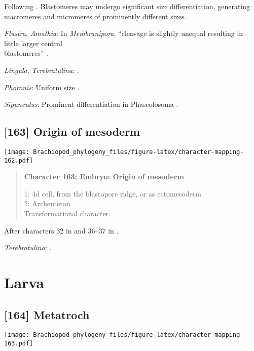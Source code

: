 \documentclass[openany]{book}
\theoremstyle{definition}
\theoremstyle{definition}
\theoremstyle{definition}
\theoremstyle{remark}
\begin{document}
Following \citet{Hejnol2010}. Blastomeres may undergo significant size
differentiation, generating macromeres and micromeres of prominently
different sizes.

\hypertarget{Amathia-coding-162}{}
\emph{Flustra}, \emph{Amathia}: In \emph{Membranipora}, ``cleavage is
slightly unequal resulting in little larger central\\
blastomeres'' \citep{Gruhl2010M}.

\hypertarget{Lingula-coding-162}{}
\emph{Lingula}, \emph{Terebratulina}: \citet{Williams1997Introduction}.

\hypertarget{Phoronis-coding-162}{}
\emph{Phoronis}: Uniform size \citep{Pennerstorfer2012}.

\hypertarget{Sipunculus-coding-162}{}
\emph{Sipunculus}: Prominent differentiation in Phascolosoma
\citep{Adrianov2011}.

\subsection*{{[}163{]} Origin of mesoderm}\label{origin-of-mesoderm}

\texttt{[image: Brachiopod\_phylogeny\_files/figure-latex/character-mapping-162.pdf]}

\begin{quote}
\textbf{Character 163: Embryo: Origin of mesoderm}

1: 4d cell, from the blastopore ridge, or as ectomesoderm\\
2: Archenteron\\
Transformational character.
\end{quote}

After characters 32 in \citet{Grobe2007} and 36--37 in
\citet{Glenner2004}.

\hypertarget{Terebratulina-coding-163}{}
\emph{Terebratulina}: \citet{Williams1997Introduction}.

\section{Larva}\label{larva}

\subsection*{{[}164{]} Metatroch}\label{metatroch}

\texttt{[image: Brachiopod\_phylogeny\_files/figure-latex/character-mapping-163.pdf]}
\end{document}
